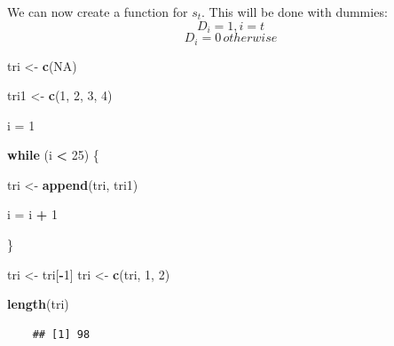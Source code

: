 \documentclass[11pt, a4paper]{report}
\newenvironment{Shaded}{\begin{snugshade}}{\end{snugshade}}
\newcommand{\ControlFlowTok}[1]{\textcolor[rgb]{0.13,0.29,0.53}{\textbf{#1}}}
\newcommand{\DecValTok}[1]{\textcolor[rgb]{0.00,0.00,0.81}{#1}}
\newcommand{\KeywordTok}[1]{\textcolor[rgb]{0.13,0.29,0.53}{\textbf{#1}}}
\newcommand{\NormalTok}[1]{#1}
\newcommand{\OperatorTok}[1]{\textcolor[rgb]{0.81,0.36,0.00}{\textbf{#1}}}
\newcommand{\OtherTok}[1]{\textcolor[rgb]{0.56,0.35,0.01}{#1}}
\newcommand{\StringTok}[1]{\textcolor[rgb]{0.31,0.60,0.02}{#1}}
\theoremstyle{plain}
\theoremstyle{plain}
\theoremstyle{remark}
\begin{document}
We can now create a function for \(s_t\). This will be done with
dummies: \[ D_i = 1, i = t \] \[ D_i = 0 \, otherwise\]

\begin{Shaded}
	\begin{Highlighting}[]
		\NormalTok{tri <-}\StringTok{ }\KeywordTok{c}\NormalTok{(}\OtherTok{NA}\NormalTok{)}
		
		\NormalTok{tri1 <-}\StringTok{ }\KeywordTok{c}\NormalTok{(}\DecValTok{1}\NormalTok{, }\DecValTok{2}\NormalTok{, }\DecValTok{3}\NormalTok{, }\DecValTok{4}\NormalTok{)}
		
		\NormalTok{i =}\StringTok{ }\DecValTok{1}
		
		\ControlFlowTok{while}\NormalTok{ (i }\OperatorTok{<}\StringTok{ }\DecValTok{25}\NormalTok{) \{}
		
		\NormalTok{    tri <-}\StringTok{ }\KeywordTok{append}\NormalTok{(tri, tri1)}
		
		\NormalTok{    i =}\StringTok{ }\NormalTok{i }\OperatorTok{+}\StringTok{ }\DecValTok{1}
		
		\NormalTok{\}}
		
		\NormalTok{tri <-}\StringTok{ }\NormalTok{tri[}\OperatorTok{-}\DecValTok{1}\NormalTok{]}
		\NormalTok{tri <-}\StringTok{ }\KeywordTok{c}\NormalTok{(tri, }\DecValTok{1}\NormalTok{, }\DecValTok{2}\NormalTok{)}
		
		\KeywordTok{length}\NormalTok{(tri)}
	\end{Highlighting}
\end{Shaded}

\begin{verbatim}
	## [1] 98
\end{verbatim}
\end{document}
